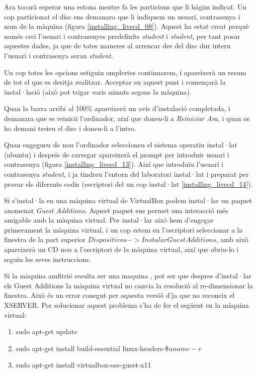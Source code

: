 Ara tocarà esperar una estona mentre fa les particions que li hàgim indicat. Un cop particionat el disc ens demanara que li indiquem un usuari, contrasenya i nom de la màquina (figura \ref{installing_livecd_08}). Aquest \LiveCD ha estat creat perquè només crei l'usuari i contrasenyes predefinits \emph{student} i \emph{student}, per tant posar aquestes dades, ja que de totes maneres al arrencar des del disc dur intern l'usuari i contrasenya seran \emph{student}.


Un cop totes les opcions estiguin omplertes continuarem, i apareixerà un resum de tot el que es desitja realitzar. Acceptar en aquest punt i començarà la instal·lació (això pot trigar varis minuts segons la màquina).

Quan la barra arribi al 100\% apareixerá un avis d'instalació completada, i demanara que es reinicii l'ordinador, així que doneu-li a \emph{Reiniciar Ara}, i quan os ho demani treieu el disc i doneu-li a l'intro.

Quan engegueu de nou l'ordinador seleccioneu el sistema operatiu instal·lat (ubuntu)
i després de carregar apareixerà el prompt per introduir usuari i contrasenya (figura \ref{installing_livecd_13}).
Així que introduïu l'usuari i contrasenya \emph{student}, i ja tindreu l'entorn del laboratori instal·lat i preparat per provar els diferents codis (escriptori del \LiveCD un cop instal·lat \ref{installing_livecd_14}).



Si s'instal·la en una màquina virtual de VirtualBox podem instal·lar un paquet anomenat \emph{Guest Additions}. Aquest paquet ens permet una interacció més amigable amb la màquina virtual. Per instal·lar això hem d'engegar primerament la màquina virtual, i un cop estem en l'escriptori seleccionar a la finestra de la part superior $Dispositivos->Instalar Guest Additions$, amb això apareixerà un CD nou a l'escriptori de la màquina virtual, així que obriu-lo i seguiu les seves instruccions.


Si la màquina amfitrió resulta ser una maquina \Ubuntu, pot ser que despres d'instal·lar els Guest Additions la màquina virtual no canvia la resolució al re-dimensionar la finestra. Això és un error conegut per aquesta versió d'\Ubuntu ja que no reconeix el XSERVER. Per solucionar aquest problema s'ha de fer el següent en la màquina virtual:

\begin{enumerate}
	\item sudo apt-get update
	\item sudo apt-get install build-essential linux-headers-\$\(uname -r\)
	\item sudo apt-get install virtualbox-ose-guest-x11
\end{enumerate}

